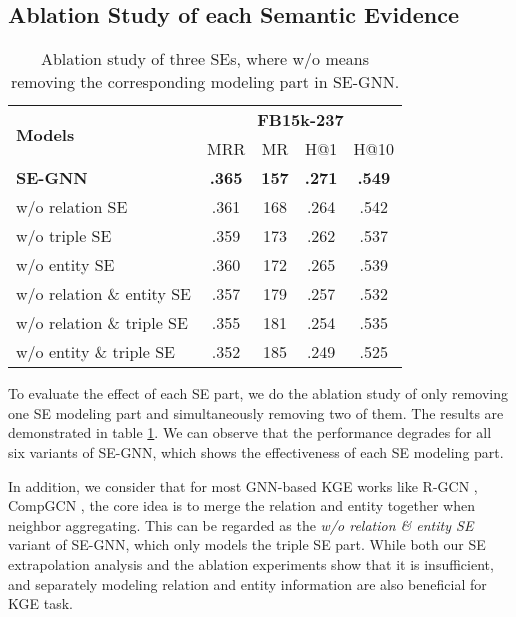 \documentclass[letterpaper]{article} \usepackage{aaai22}  \usepackage{times}  \usepackage{helvet}  \usepackage{courier}  \usepackage[hyphens]{url}  \usepackage{graphicx} \urlstyle{rm} \def\UrlFont{\rm}  \usepackage{natbib}  \usepackage{caption} \DeclareCaptionStyle{ruled}{labelfont=normalfont,labelsep=colon,strut=off} \frenchspacing  \setlength{\pdfpagewidth}{8.5in}  \setlength{\pdfpageheight}{11in}  \usepackage{algorithm}
\begin{document}
\subsection{Ablation Study of each Semantic Evidence}
\begin{table}
    \setlength\tabcolsep{4.8pt}
    \centering
    \begin{tabular}{lcccc}
      \toprule
      \multirow{2}{*}{\textbf{Models}} & \multicolumn{4}{c}{\textbf{FB15k-237}} \\
      \cline{2-5}
      & MRR & MR & H@1 & H@10 \\
      \hline \hline
      \textbf{SE-GNN}     & \textbf{.365} & \textbf{157} & \textbf{.271} & \textbf{.549} \\
      w/o relation SE & .361 & 168 & .264 & .542 \\
      w/o triple SE & .359 & 173 & .262 & .537 \\
      w/o entity SE & .360 & 172 & .265 & .539 \\
      w/o relation \& entity SE & .357 & 179 & .257 & .532 \\
      w/o relation \& triple SE & .355 & 181 & .254 & .535 \\
      w/o entity \& triple SE & .352 & 185 & .249 & .525 \\
      \bottomrule
    \end{tabular}
    \caption{Ablation study of three SEs, where w/o means removing the corresponding modeling part in SE-GNN.}
    \label{tab: ablation study}
\end{table}

To evaluate the effect of each SE part, we do the ablation study of only removing one SE modeling part and simultaneously removing two of them. The results are demonstrated in table \ref{tab: ablation study}. We can observe that the performance degrades for all six variants of SE-GNN, which shows the effectiveness of each SE modeling part. 

In addition, we consider that for most GNN-based KGE works like R-GCN \cite{ESWC_2018_Schlichtkrull_R-GCN}, CompGCN \cite{ICLR_2020_Vashishth_CompGCN}, the core idea is to merge the relation and entity together when neighbor aggregating. This can be regarded as the \textit{w/o relation \& entity SE} variant of SE-GNN, which only models the triple SE part. While both our SE extrapolation analysis and the ablation experiments show that it is insufficient, and separately modeling relation and entity information are also beneficial for KGE task. 
\end{document}
